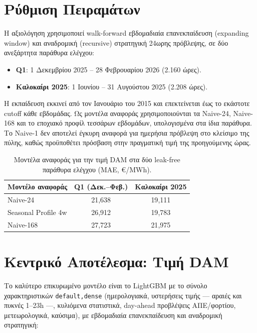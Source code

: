 \section{Ρύθμιση Πειραμάτων}
\label{sec:lf_setup}

Η αξιολόγηση χρησιμοποιεί walk-forward εβδομαδιαία επανεκπαίδευση (expanding
window) και αναδρομική (recursive) στρατηγική 24ωρης πρόβλεψης, σε δύο ανεξάρτητα
παράθυρα ελέγχου:

\begin{itemize}
  \item \textbf{Q1}: 1 Δεκεμβρίου 2025 -- 28 Φεβρουαρίου 2026 (2.160 ώρες).
  \item \textbf{Καλοκαίρι 2025}: 1 Ιουνίου -- 31 Αυγούστου 2025 (2.208 ώρες).
\end{itemize}

Η εκπαίδευση εκκινεί από τον Ιανουάριο του 2015 και επεκτείνεται έως το εκάστοτε
cutoff κάθε εβδομάδας. Ως μοντέλα αναφοράς χρησιμοποιούνται τα Naive-24,
Naive-168 και το εποχιακό προφίλ τεσσάρων εβδομάδων, υπολογισμένα στα ίδια
παράθυρα. Το Naive-1 δεν αποτελεί έγκυρη αναφορά για ημερήσια πρόβλεψη στο
κλείσιμο της πύλης, καθώς προϋποθέτει πρόσβαση στην πραγματική τιμή της
προηγούμενης ώρας.

\begin{table}[H]
  \centering
  \caption{Μοντέλα αναφοράς για την τιμή DAM στα δύο leak-free παράθυρα ελέγχου (MAE, €/MWh).}
  \label{tab:lf_benchmarks}
  \begin{tabular}{lcc}
    \toprule
    \textbf{Μοντέλο αναφοράς} & \textbf{Q1 (Δεκ.--Φεβ.)} & \textbf{Καλοκαίρι 2025} \\
    \midrule
    Naive-24            & 21{,}638 & 19{,}111 \\
    Seasonal Profile 4w & 26{,}912 & 19{,}783 \\
    Naive-168           & 27{,}723 & 21{,}975 \\
    \bottomrule
  \end{tabular}
\end{table}

\section{Κεντρικό Αποτέλεσμα: Τιμή DAM}
\label{sec:lf_headline}

Το καλύτερο επικυρωμένο μοντέλο είναι το LightGBM με το σύνολο χαρακτηριστικών
\texttt{default,dense} (ημερολογιακά, υστερήσεις τιμής --- αραιές και πυκνές
1--23h ---, κυλιόμενα στατιστικά, day-ahead προβλέψεις ΑΠΕ/φορτίου, μετεωρολογικά,
καύσιμα), με εβδομαδιαία επανεκπαίδευση και αναδρομική στρατηγική:

